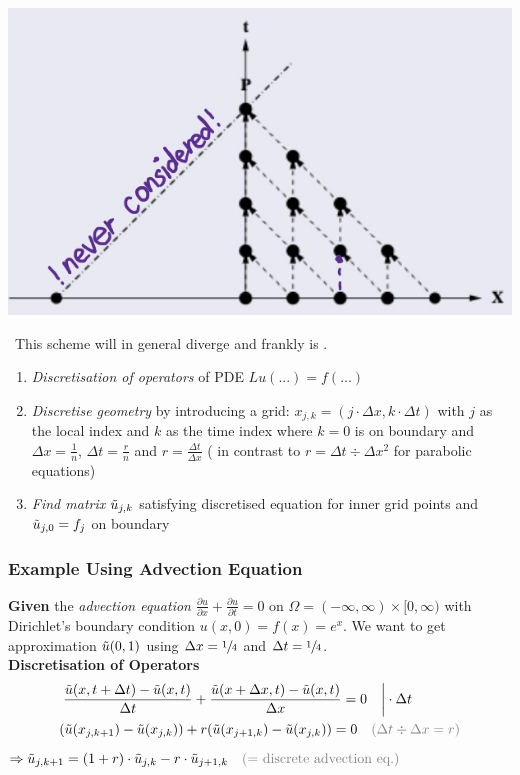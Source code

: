 
\includegraphics[width=0.3\columnwidth]{images/downwind_scheme}

{\color{orange}\faWarning\ This scheme will in general diverge and frankly is \faTrash.}

\begin{enumerate}
	\item \emph{Discretisation of operators} of PDE $Lu(...)=f(...)$
	\item{
		\emph{Discretise geometry} by introducing a grid:
		$x_{j,k} = (j\cdot\Delta x, k\cdot\Delta t)$ with $j$ as the local index
		and $k$ as the time index where $k=0$ is on boundary
		and \colorbox{shadecolor}{$\Delta x = \frac{1}{n}$},
		\colorbox{shadecolor}{$\Delta t = \frac{r}{n}$}
		and \colorbox{shadecolor}{$r = \frac{\Delta t}{\Delta x}$} 
		({\color{orange}\faWarning} in contrast to $r=\Delta t\div\Delta x^2$ for parabolic equations)
	}
	\item{
		\emph{Find matrix $\tilde{u}_{j,k}$} satisfying discretised equation for inner grid points
		and $\tilde{u}_{j,0}=f_j$ on boundary
	}
\end{enumerate}

\subsubsection{Example Using Advection Equation}

\textbf{Given} the \emph{advection equation 
$\frac{\partial u}{\partial x} + \frac{\partial u}{\partial t} = 0$} on
$\Omega = (-\infty,\infty)\times[0,\infty)$ with Dirichlet's boundary condition
$u(x,0) = f(x) = e^x$. We want to get approximation $\tilde{u}(0,1)$ using
$\Delta x = \sfrac{1}{4}$ and $\Delta t = \sfrac{1}{4}$.
\\[1em]
\textbf{Discretisation of Operators}
\begin{align*}
	& \left.{\frac{\utild(x,t+\Delta t)-\utild(x,t)}{\Delta t}}
	+ {\frac{\utild(x+\Delta x,t)-\utild(x,t)}{\Delta x}} = 0\quad\right|\cdot \Delta t \\
	& (\utild(x_{j,k+1})-\utild(x_{j,k}))+r(\utild(x_{j+1,k})-\utild(x_{j,k}))=0
	{\color{gray} \quad(\Delta t\div\Delta x = r)}
\end{align*}
\colorbox{shadecolor}{$
	\displaystyle
	\Rightarrow \utild_{j,k+1}
	= \left(1+r\right)\cdot\utild_{j,k}-r\cdot\utild_{j+1,k}
	{\color{gray}\quad\text{(= discrete advection eq.)}}
$}

